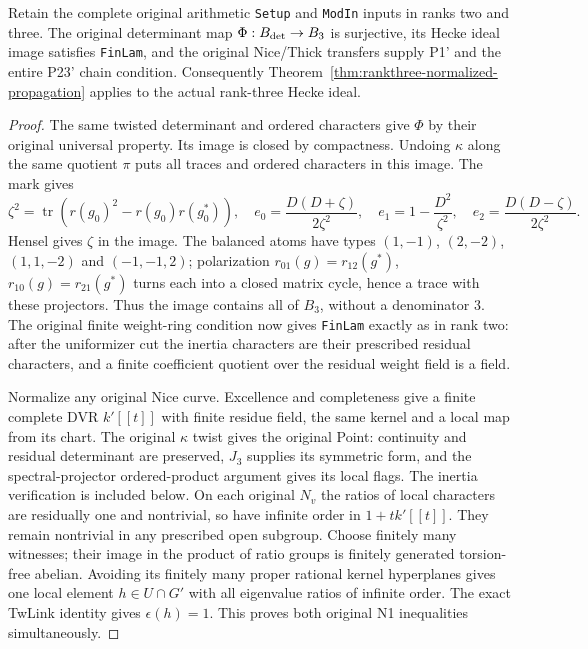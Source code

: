\begin{theorem}
\label{thm:rankthree-arithmetic-transfer}
Retain the complete original arithmetic \texttt{Setup} and
\texttt{ModIn} inputs in ranks two and three.  The original
determinant map $\Phi:B_{\rm det}\to B_3$ is surjective, its Hecke
ideal image satisfies \texttt{FinLam}, and the original Nice/Thick
transfers supply P1' and the entire P23' chain condition.
Consequently Theorem~\ref{thm:rankthree-normalized-propagation}
applies to the actual rank-three Hecke ideal.
\end{theorem}
\begin{proof}
The same twisted determinant and ordered characters give $\Phi$
by their original universal property.  Its image is closed by
compactness.  Undoing $\kappa$ along the same quotient $\pi$ puts
all traces and ordered characters in this image.  The mark gives
\[
 \zeta^2=\operatorname{tr}(r(g_0)^2-r(g_0)r(g_0^*)),\quad
 e_0=\frac{D(D+\zeta)}{2\zeta^2},\quad
 e_1=1-\frac{D^2}{\zeta^2},\quad
 e_2=\frac{D(D-\zeta)}{2\zeta^2}.
\]
Hensel gives $\zeta$ in the image.  The balanced atoms have types
$(1,-1)$, $(2,-2)$, $(1,1,-2)$ and $(-1,-1,2)$; polarization
$r_{01}(g)=r_{12}(g^*)$, $r_{10}(g)=r_{21}(g^*)$ turns each into
a closed matrix cycle, hence a trace with these projectors.
Thus the image contains all of $B_3$, without a denominator $3$.
The original finite weight-ring condition now gives
\texttt{FinLam} exactly as in rank two: after the uniformizer cut
the inertia characters are their prescribed residual characters,
and a finite coefficient quotient over the residual weight field
is a field.

Normalize any original Nice curve.  Excellence and completeness
give a finite complete DVR $k'[[t]]$ with finite residue field,
the same kernel and a local map from its chart.  The original
$\kappa$ twist gives the original Point: continuity and residual
determinant are preserved, $J_3$ supplies its symmetric form,
and the spectral-projector ordered-product argument gives its
local flags.  The inertia verification is included below.
On each original $N_v$ the ratios of local characters are
residually one and nontrivial, so have infinite order in
$1+tk'[[t]]$.  They remain nontrivial in any prescribed open subgroup.
Choose finitely many witnesses; their image in the product of
ratio groups is finitely generated torsion-free abelian.
Avoiding its finitely many proper rational kernel hyperplanes gives
one local element $h\in U\cap G'$ with all eigenvalue ratios of
infinite order.  The exact TwLink identity gives $\epsilon(h)=1$.
This proves both original N1 inequalities simultaneously.


\end{proof}
